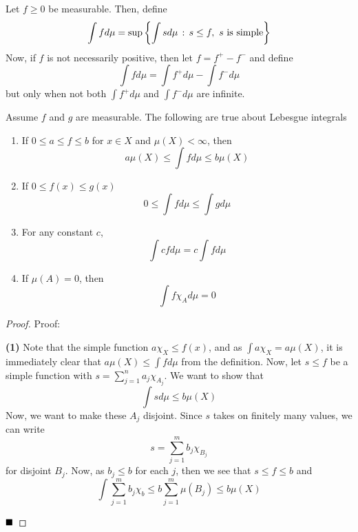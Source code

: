 \begin{definition}
    Let $f \geq 0$ be measurable. Then, define
    \[ \int f d\mu = \sup\left\{\int s d\mu \, :\, s \leq f,\ s \text{ is simple}\right\} \]
    Now, if $f$ is not necessarily positive, then let $f = f^{+} - f^{-}$ and define
    \[ \int f d\mu = \int f^{+}d\mu - \int f^{-}d\mu \]
    but only when not both $\int f^{+}d\mu$ and $\int f^{-}d\mu$ are infinite. 
\end{definition}

\begin{lemma}
    Assume $f$ and $g$ are measurable. The following are true about Lebesgue integrals
    \begin{enumerate}
        \item If $0 \leq a \leq f \leq b$ for $x \in X$ and $\mu(X) < \infty$, then
        \[ a\mu(X) \leq \int f d\mu \leq b\mu(X) \]
        \item If $0 \leq f(x) \leq g(x)$
        \[ 0 \leq \int fd\mu \leq \int gd\mu \]
        \item For any constant $c$, 
        \[ \int cf d\mu = c \int f d\mu \]
        \item If $\mu(A) = 0$, then
        \[ \int f\chi_{A}d\mu = 0 \]
    \end{enumerate}
\end{lemma}
\begin{proof}{Proof:}
    
    \textbf{(1)} Note that the simple function $a\chi_{X} \leq f(x)$, and as $\int a\chi_{X} = a\mu(X)$, it is immediately clear that $a\mu(X) \leq \int f d\mu$ from the definition. Now, let $s \leq f$ be a simple function with $s = \sum_{j = 1}^{n} a_j\chi_{A_j}$. We want to show that
    \[ \int s d\mu \leq b\mu(X) \]
    Now, we want to make these $A_j$ disjoint. Since $s$ takes on finitely many values, we can write
    \[ s = \sum_{j = 1}^{m} b_j\chi_{B_j} \]
    for disjoint $B_j$. Now, as $b_j \leq b$ for each $j$, then we see that $s \leq f \leq b$ and 
    \[ \int \sum_{j = 1}^{m} b_j\chi_{b} \leq b\sum_{j = 1}^{m}\mu(B_j) \leq b\mu(X) \]

    $\qed$
\end{proof}